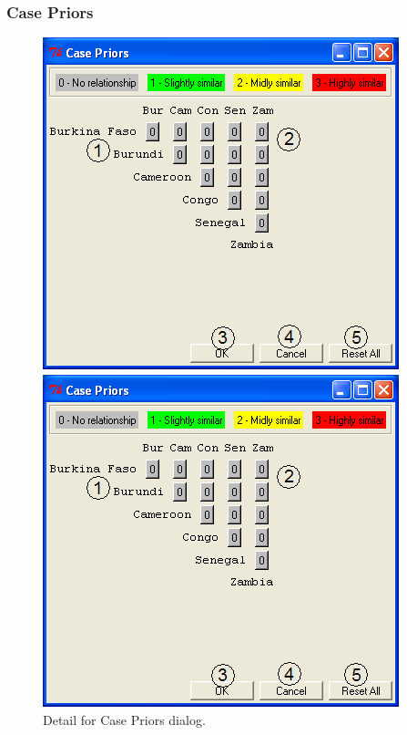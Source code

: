 \documentclass[12pt,titlepage]{article}
\begin{document}
\subsubsection{Case Priors}
\label{sec:refcasepri}
\begin{figure}[ht]
 \begin{htmlonly} 
  \centering \includegraphics[scale=1]{case} 
 \end{htmlonly}
 \begin{latexonly}
  \centering \includegraphics[scale=.75]{case}
 \end{latexonly}
\caption{Detail for Case Priors dialog.}
\end{figure}
\end{document}
